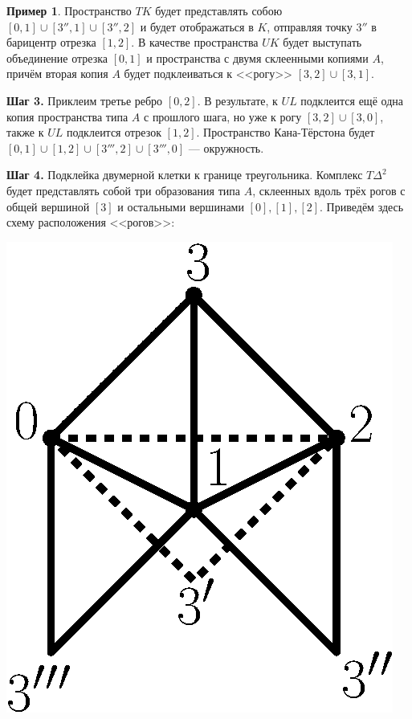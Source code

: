 \documentclass[14pt, dvipsnames]{extarticle}
\theoremstyle{definition}
\newtheorem{example}{Пример}
\theoremstyle{remark}
\begin{document}
\begin{example}
Пространство $TK$ будет представлять собою $[0, 1]\cup [3'', 1]\cup [3'', 2]$ и будет отображаться в $K$, отправляя точку $3''$ в барицентр отрезка $[1, 2]$. В качестве пространства $UK$ будет выступать объединение отрезка $[0, 1]$ и пространства с двумя склеенными копиями $A$, причём вторая копия $A$ будет подклеиваться к <<рогу>> $[3,2]\cup [3, 1]$. 

{\bf Шаг 3.} Приклеим третье ребро $[0, 2]$. В результате, к $UL$ подклеится ещё одна копия пространства типа $A$ с прошлого шага, но уже к рогу $[3, 2]\cup [3, 0]$, также к $UL$ подклеится отрезок $[1, 2]$. Пространство Кана-Тёрстона будет $[0, 1]\cup [1, 2]\cup [3''', 2]\cup [3''', 0]$ --- окружность.



{\bf Шаг 4.} Подклейка двумерной клетки к границе треугольника. Комплекс $T\Delta^2$ будет представлять собой три образования типа $A$, склеенных вдоль трёх рогов с общей вершиной $[3]$ и остальными вершинами $[0], [1], [2]$. Приведём здесь схему расположения <<рогов>>:


\begin{center}
\includegraphics[scale=0.5]{pict7}
\end{center}


\end{example}
\end{document}
